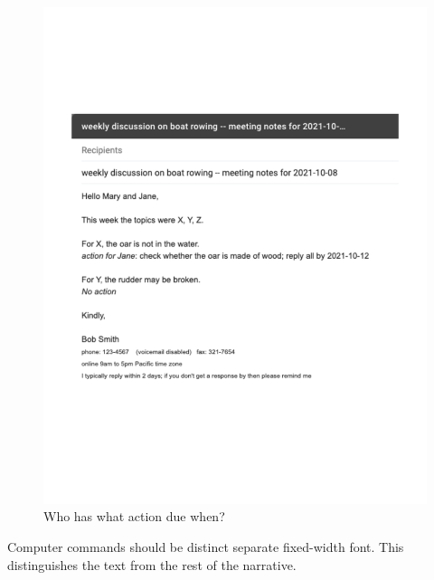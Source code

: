\begin{figure}
\includegraphics[width=1\textwidth]{images/email_meeting_notes.pdf}
\caption{Who has what action due when?}
\label{fig:email_meeting_notes}
\end{figure}

Computer commands should be distinct separate fixed-width font. This distinguishes the text from the rest of the narrative. 


